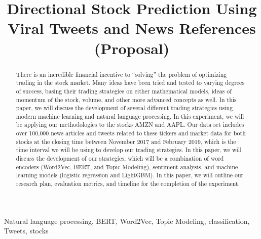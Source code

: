 \documentclass[conference]{IEEEtran}
\begin{document}
\title{Directional Stock Prediction Using Viral Tweets and News References (Proposal)\\
}

\author{
    \and
    \and
    \and
    \and
}

\maketitle

\begin{abstract}
    There is an incredible financial incentive to “solving” the problem of optimizing trading in the stock market. Many ideas have been tried and tested to varying degrees of success, basing their trading strategies on either mathematical models, ideas of momentum of the stock, volume, and other more advanced concepts as well. In this paper, we will discuss the development of several different trading strategies using modern machine learning and natural language processing. In this experiment, we will be applying our methodologies to the stocks AMZN and AAPL. Our data set includes over 100,000 news articles and tweets related to these tickers and market data for both stocks at the closing time between November 2017 and February 2019, which is the time interval we will be using to develop our trading strategies. In this paper, we will discuss the development of our strategies, which will be a combination of word encoders (Word2Vec, BERT, and Topic Modeling), sentiment analysis, and machine learning models (logistic regression and LightGBM). In this paper, we will outline our research plan, evaluation metrics, and timeline for the completion of the experiment.
\end{abstract}

\begin{IEEEkeywords}
    Natural language processing, BERT, Word2Vec, Topic Modeling, classification, Tweets, stocks
\end{IEEEkeywords}
\end{document}
